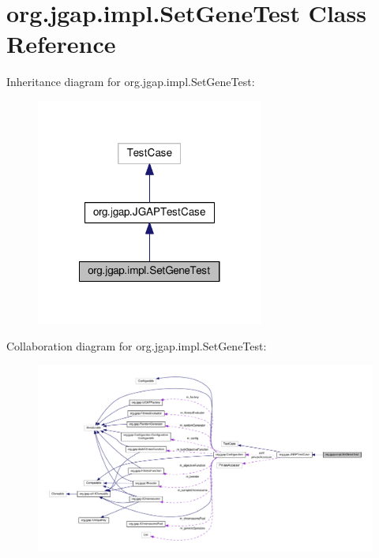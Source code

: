 \hypertarget{classorg_1_1jgap_1_1impl_1_1_set_gene_test}{\section{org.\-jgap.\-impl.\-Set\-Gene\-Test Class Reference}
\label{classorg_1_1jgap_1_1impl_1_1_set_gene_test}
}


Inheritance diagram for org.\-jgap.\-impl.\-Set\-Gene\-Test\-:
\nopagebreak
\begin{figure}[H]
\begin{center}
\leavevmode
\includegraphics[width=212pt]{classorg_1_1jgap_1_1impl_1_1_set_gene_test__inherit__graph}
\end{center}
\end{figure}


Collaboration diagram for org.\-jgap.\-impl.\-Set\-Gene\-Test\-:
\nopagebreak
\begin{figure}[H]
\begin{center}
\leavevmode
\includegraphics[width=350pt]{classorg_1_1jgap_1_1impl_1_1_set_gene_test__coll__graph}
\end{center}
\end{figure}
